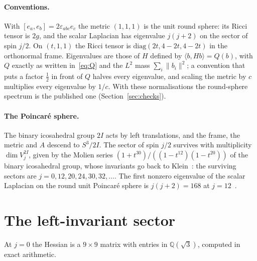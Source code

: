 \documentclass[11pt]{article}
\theoremstyle{definition}
\theoremstyle{remark}
\newif\ifredline
\newcommand{\redins}[1]{\ifredline{\color{blue}#1}\else#1\fi}
\newcommand{\norm}[1]{\lVert #1\rVert}
\begin{document}
\redins{\paragraph{Conventions.} With $[e_a,e_b]=2\varepsilon_{abc}e_c$ the metric $(1,1,1)$ is the unit round
sphere: its Ricci tensor is $2g$, and the scalar Laplacian has eigenvalue $j(j+2)$ on the sector of spin $j/2$. On
$(t,1,1)$ the Ricci tensor is $\mathrm{diag}(2t,4-2t,4-2t)$ in the orthonormal frame. Eigenvalues are those of $H$
defined by $\langle b,Hb\rangle=Q(b)$, with $Q$ exactly as written in~\eqref{eq:Q} and the $L^2$ mass
$\sum_i\norm{b_i}^2$; a convention that puts a factor $\tfrac12$ in front of $Q$ halves every eigenvalue, and scaling
the metric by $c$ multiplies every eigenvalue by $1/c$. With these normalisations the round-sphere spectrum is the
published one (Section~\ref{sec:checks}).}

\paragraph{The Poincar\'e sphere.} The binary icosahedral group $2I$ acts by left translations, and
the frame, the metric and $A$ descend to $S^3/2I$. The sector of spin $j/2$ survives with
multiplicity $\dim V_j^{2I}$, given by the Molien series $(1+t^{30})/((1-t^{12})(1-t^{20}))$ of
the binary icosahedral group, whose invariants go back to Klein~\cite{klein1884}: the surviving sectors are $j=0,12,20,24,30,32,\dots$. The first
nonzero eigenvalue of the scalar Laplacian on the \redins{round }unit Poincar\'e sphere is $j(j+2)=168$ at
$j=12$~\cite{lachiezerey2004}.

\section{The left-invariant sector}\label{sec:spin0}

At $j=0$ the Hessian is a $9\times9$ matrix with entries in $\mathbb{Q}(\sqrt3)$, computed in exact
arithmetic.
\end{document}
